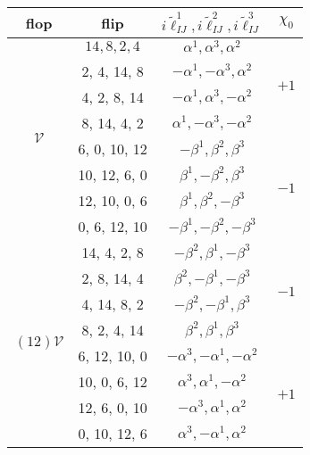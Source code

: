 \begin{table}[!htbp]
	\label{t:elltilde}
	\begin{tabular}{|c|c|c|c|}
	\hline
			flop & flip & $i\tilde{\ell}_{IJ}^1, i\tilde{\ell}_{IJ}^2, i\tilde{\ell}_{IJ}^3 $ & $\chi_0$\\
			\hline
			\multirow{8}{*}{$\mathcal{V}$} & $14,8,2,4$ & $ \alpha ^1,\alpha ^3,\alpha ^2 $ & \multirow{4}{*}{$+1$}\\
			\cline{2-3}
			& 2, 4, 14, 8 & $-\alpha ^1,-\alpha ^3,\alpha ^2$ & \\
			\cline{2-3} 
			&4, 2, 8, 14& $-\alpha ^1,\alpha ^3,-\alpha ^2$& \\
			\cline{2-3} 
			&8, 14, 4, 2& $ \alpha ^1,-\alpha ^3,-\alpha ^2$ & \\
			\cline{2-4} 
			&6, 0, 10, 12&  $-\beta ^1,\beta ^2,\beta ^3$  & \multirow{4}{*}{$-1$} \\
			\cline{2-3} 
			&10, 12, 6, 0& $\beta ^1,-\beta ^2,\beta ^3$   & \\
			\cline{2-3} 
			&12, 10, 0, 6& $\beta ^1,\beta ^2,-\beta ^3$    & \\
			\cline{2-3} 
			&0, 6, 12, 10& $-\beta ^1,-\beta ^2,-\beta ^3$& \\
			\hline
			\hline
			\multirow{8}{*}{$(12)\mathcal{V}$} & 14, 4, 2, 8 & $-\beta ^2,\beta ^1,-\beta ^3$ & \multirow{4}{*}{$-1$}\\
			\cline{2-3}
			&2, 8, 14, 4& $\beta ^2,-\beta ^1,-\beta ^3$& \\
			\cline{2-3} 
			&4, 14, 8, 2& $-\beta ^2,-\beta ^1,\beta ^3$& \\
			\cline{2-3} 
			&8, 2, 4, 14&  $\beta ^2,\beta ^1,\beta ^3$  & \\
			\cline{2-4} 
			&6, 12, 10, 0& $-\alpha ^3,-\alpha ^1,-\alpha ^2$   & \multirow{4}{*}{$+1$}\\
			\cline{2-3} 
			&10, 0, 6, 12& $\alpha ^3,\alpha ^1,-\alpha ^2$   & \\
			\cline{2-3} 
			&12, 6, 0, 10& $-\alpha ^3,\alpha ^1,\alpha ^2$   & \\
			\cline{2-3} 
			&0, 10, 12, 6& $\alpha ^3,-\alpha ^1,\alpha ^2$& \\
			\hline
			\hline

\end{tabular}
\end{table}

